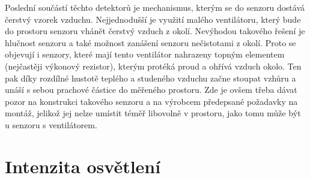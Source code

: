 Poslední součástí těchto detektorů je mechanismus, kterým se do senzoru dostává čerstvý vzorek vzduchu. Nejjednodušší je využití malého ventilátoru, který bude do prostoru senzoru vhánět čerstvý vzduch z okolí. Nevýhodou takového řešení je hlučnost senzoru a také možnost zanášení senzoru nečistotami z okolí. Proto se objevují i senzory, které mají tento ventilátor nahrazeny topným elementem (nejčastěji výkonový rezistor), kterým protéká proud a ohřívá vzduch okolo. Ten pak díky rozdílné hustotě teplého a studeného vzduchu začne stoupat vzhůru a unáší s sebou prachové částice do měřeného prostoru. Zde je ovšem třeba dávat pozor na konstrukci takového senzoru a na výrobcem předepsané požadavky na montáž, jelikož jej nelze umístit téměř libovolně v prostoru, jako tomu může být u senzoru s ventilátorem.

\section{Intenzita osvětlení}
